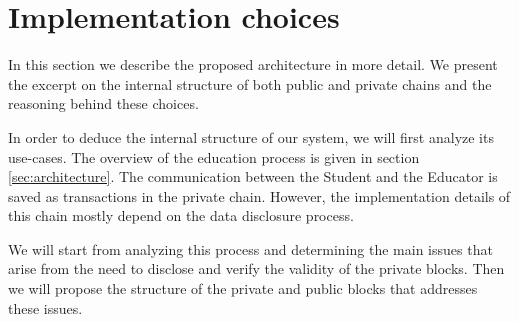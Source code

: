 
\section{Implementation choices}
In this section we describe the proposed architecture in more detail. We present the excerpt on the internal structure of both public and private chains and the reasoning behind these choices.

In order to deduce the internal structure of our system, we will first analyze its use-cases. The overview of the education process is given in section \ref{sec:architecture}. The communication between the Student and the Educator is saved as transactions in the private chain. However, the implementation details of this chain mostly depend on the data disclosure process.

We will start from analyzing this process and determining the main issues that arise from the need to disclose and verify the validity of the private blocks. Then we will propose the structure of the private and public blocks that addresses these issues.








